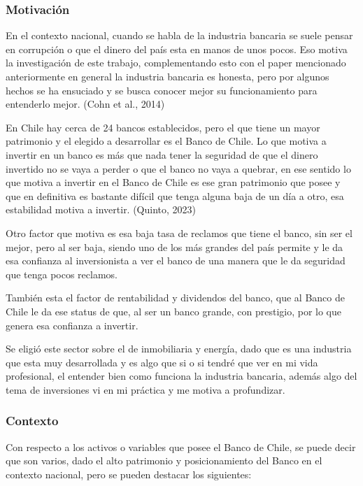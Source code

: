 \documentclass[
  letterpaper,
  DIV=11,
  numbers=noendperiod]{scrartcl}
\begin{document}
\hypertarget{motivaciuxf3n}{%
\subsubsection{Motivación}\label{motivaciuxf3n}}

En el contexto nacional, cuando se habla de la industria bancaria se
suele pensar en corrupción o que el dinero del país esta en manos de
unos pocos. Eso motiva la investigación de este trabajo, complementando
esto con el paper mencionado anteriormente en general la industria
bancaria es honesta, pero por algunos hechos se ha ensuciado y se busca
conocer mejor su funcionamiento para entenderlo mejor. (Cohn et al.,
2014)

En Chile hay cerca de 24 bancos establecidos, pero el que tiene un mayor
patrimonio y el elegido a desarrollar es el Banco de Chile. Lo que
motiva a invertir en un banco es más que nada tener la seguridad de que
el dinero invertido no se vaya a perder o que el banco no vaya a
quebrar, en ese sentido lo que motiva a invertir en el Banco de Chile es
ese gran patrimonio que posee y que en definitiva es bastante difícil
que tenga alguna baja de un día a otro, esa estabilidad motiva a
invertir. (Quinto, 2023)

Otro factor que motiva es esa baja tasa de reclamos que tiene el banco,
sin ser el mejor, pero al ser baja, siendo uno de los más grandes del
país permite y le da esa confianza al inversionista a ver el banco de
una manera que le da seguridad que tenga pocos reclamos.

También esta el factor de rentabilidad y dividendos del banco, que al
Banco de Chile le da ese status de que, al ser un banco grande, con
prestigio, por lo que genera esa confianza a invertir.

Se eligió este sector sobre el de inmobiliaria y energía, dado que es
una industria que esta muy desarrollada y es algo que si o si tendré que
ver en mi vida profesional, el entender bien como funciona la industria
bancaria, además algo del tema de inversiones vi en mi práctica y me
motiva a profundizar.

\hypertarget{contexto}{%
\subsubsection{Contexto}\label{contexto}}

Con respecto a los activos o variables que posee el Banco de Chile, se
puede decir que son varios, dado el alto patrimonio y posicionamiento
del Banco en el contexto nacional, pero se pueden destacar los
siguientes:
\end{document}
